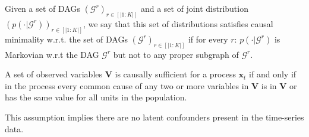\vspace{-2pt}
\begin{assumption}
 Given a set of DAGs $(\mathcal{G}^r)_{r \in [|1:K|]}$ and a set of joint distribution $(p(\cdot|\mathcal{G}^r))_{r \in [|1:K|]}$, we say that this set of distributions satisfies causal minimality w.r.t. the set of DAGs $(\mathcal{G}^r)_{r \in [|1:K|]}$  if for every $r$: $p(\cdot|\mathcal{G}^r)$ is Markovian w.r.t the DAG $\mathcal{G}^r$ but not to any proper subgraph of $\mathcal{G}^r$.
\label{mainass3}
\end{assumption}
\vspace{-2pt}
\begin{assumption}
A set of observed variables $\boldsymbol{V}$ is causally sufficient for a process $\boldsymbol{x}_t$ if and only if in the process every common cause of any two or more variables in $\boldsymbol{V}$ is in $\boldsymbol{V}$ or has the same value for all units in the population.  \label{mainass4}
\end{assumption}
This assumption implies there are no latent confounders present in the time-series data.
